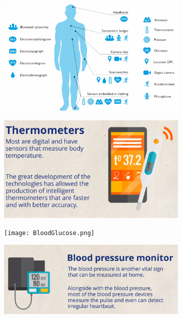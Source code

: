 \documentclass[10pt, twoside]{article}   	%
\begin{document}
 \begin{figure}
     \centering
     \begin{subfigure}[b]{0.8\textwidth}
         \centering
         \includegraphics[width=\textwidth]{wearable0.png}
     \end{subfigure}
     \hfill
\begin{subfigure}[b]{0.25\textwidth}
    \centering
    \includegraphics[width=\textwidth]{Thermometer.png}
\end{subfigure}
\hfill
\begin{subfigure}[b]{0.24\textwidth}
    \centering
    \texttt{[image: BloodGlucose.png]}
\end{subfigure}
\hfill
\begin{subfigure}[b]{0.35\textwidth}
    \centering
    \includegraphics[width=\textwidth]{BloodPressure.png}

\end{subfigure}
\end{figure}
\end{document}
